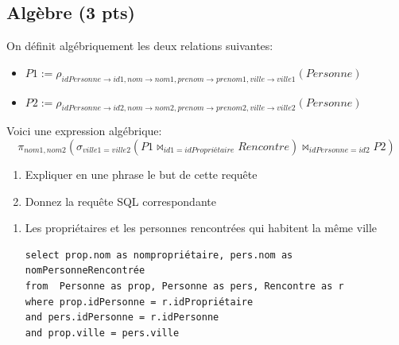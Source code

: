 \subsection*{Algèbre (3 pts)}

On définit algébriquement les deux relations suivantes:

\begin{itemize}
  \item $P1 := \rho_{idPersonne \to id1, nom \to nom1, prenom \to prenom1, ville \to ville1} (Personne)$
  \item $P2 := \rho_{idPersonne \to id2, nom \to nom2, prenom \to prenom2, ville \to ville2} (Personne)$
\end{itemize}

Voici une expression algébrique:
$$\pi_{nom1, nom2} (\sigma_{ville1=ville2} (P1 \Join_{id1=idPropriétaire} Rencontre) \Join_{idPersonne=id2} P2)$$

\begin{enumerate}
  \item Expliquer en une phrase le but de cette requête
    \item Donnez la requête SQL correspondante
\end{enumerate}


\begin{solution}

\begin{enumerate}
  \item Les propriétaires et les personnes rencontrées qui habitent la même ville
  \begin{verbatim}
select prop.nom as nompropriétaire, pers.nom as nomPersonneRencontrée 
from  Personne as prop, Personne as pers, Rencontre as r
where prop.idPersonne = r.idPropriétaire
and pers.idPersonne = r.idPersonne
and prop.ville = pers.ville
\end{verbatim}
\end{enumerate}

\end{solution}

